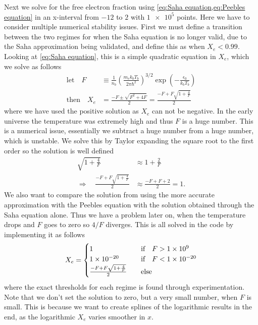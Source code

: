 \documentclass[10pt,a4paper]{article}
\begin{document}
Next we solve for the free electron fraction using \cref{eq:Saha equation,eq:Peebles equation} in an x-interval from $-12$ to $2$ with $\num{1e5}$ points. Here we have to consider multiple numerical stability issues. First we must define a transition between the two regimes for when the Saha equation is no longer valid, due to the Saha approximation being validated, and define this as when $X_e < 0.99$. Looking at \cref{eq:Saha equation}, this is a simple quadratic equation in $X_e$, which we solve as follows
\begin{align*}
    \text{let} \quad  F &\equiv \frac{1}{n_b}\left(\frac{m_e k_b T_b}{2\pi \hbar^2}\right)^{3/2} \exp(-\frac{\epsilon_0}{k_b T_b})
    \\
    \text{then} \quad X_e &= \frac{-F \pm \sqrt{F^2 + 4F}}{2} = \frac{-F + F\sqrt{1+\frac{4}{F}}}{2}
\end{align*}
where we have used the positive solution as $X_e$ can not be negative. In the early universe the temperature was extremely high and thus $F$ is a huge number. This is a numerical issue, essentially we subtract a huge number from a huge number, which is unstable. We solve this by Taylor expanding the square root to the first order so the solution is well defined
\begin{align*}
    \sqrt{1+\frac{4}{F}} &\approx 1+ \frac{2}{F}
    \\
    \Rightarrow \quad \frac{-F + F\sqrt{1+\frac{4}{F}}}{2} &\approx \frac{-F + F +2}{2} = 1.
\end{align*}
We also want to compare the solution from using the more accurate approximation with the Peebles equation with the solution obtained through the Saha equation alone. Thus we have a problem later on, when the temperature drops and $F$ goes to zero so $4/F$ diverges. This is all solved in the code by implementing it as follows
\begin{align*}
    X_e = \begin{cases}
        \num{1} &\qif F > \num{1e9}
        \\
        \num{1e-20} &\qif F < \num{1e-20}
        \\
        \frac{-F + F\sqrt{1+\frac{4}{F}}}{2}  &\quad \text{else}
    \end{cases}
\end{align*}
where the exact thresholds for each regime is found through experimentation. Note that we don't set the solution to zero, but a very small number, when $F$ is small. This is because we want to create splines of the logarithmic results in the end, as the logarithmic $X_e$ varies smoother in $x$.
\end{document}
